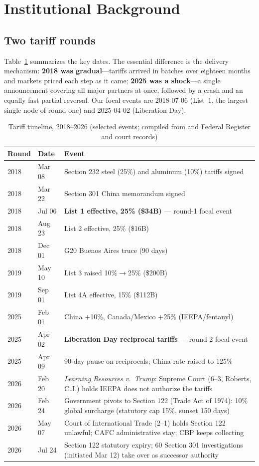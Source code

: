 \documentclass[11pt,a4paper]{article}
\begin{document}
\section{Institutional Background}\label{sec:background}

\subsection{Two tariff rounds}

Table~\ref{tab:timeline} summarizes the key dates. The essential difference
is the delivery mechanism: \textbf{2018 was gradual}---tariffs arrived in
batches over eighteen months and markets priced each step as it came;
\textbf{2025 was a shock}---a single announcement covering all major
partners at once, followed by a crash and an equally fast partial reversal.
Our focal events are 2018-07-06 (List~1, the largest single node of round
one) and 2025-04-02 (Liberation Day).

\begin{table}[htbp]
\centering
\caption{Tariff timeline, 2018--2026 (selected events; compiled from
\citealp{bownkolb2025} and Federal Register and court records)}
\label{tab:timeline}
\small
\begin{tabular}{@{}llp{9.0cm}@{}}
\toprule
Round & Date & Event \\
\midrule
2018 & Mar 08 & Section 232 steel (25\%) and aluminum (10\%) tariffs signed \\
2018 & Mar 22 & Section 301 China memorandum signed \\
2018 & Jul 06 & \textbf{List 1 effective, 25\% (\$34B)} --- round-1 focal event \\
2018 & Aug 23 & List 2 effective, 25\% (\$16B) \\
2018 & Dec 01 & G20 Buenos Aires truce (90 days) \\
2019 & May 10 & List 3 raised 10\%$\to$25\% (\$200B) \\
2019 & Sep 01 & List 4A effective, 15\% (\$112B) \\
\midrule
2025 & Feb 01 & China +10\%, Canada/Mexico +25\% (IEEPA/fentanyl) \\
2025 & Apr 02 & \textbf{Liberation Day reciprocal tariffs} --- round-2 focal event \\
2025 & Apr 09 & 90-day pause on reciprocals; China rate raised to 125\% \\
\midrule
2026 & Feb 20 & \emph{Learning Resources v.\ Trump}: Supreme Court (6--3,
Roberts, C.J.) holds IEEPA does not authorize the tariffs \\
2026 & Feb 24 & Government pivots to Section 122 (Trade Act of 1974): 10\%
global surcharge (statutory cap 15\%, sunset 150 days) \\
2026 & May 07 & Court of International Trade (2--1) holds Section 122
unlawful; CAFC administrative stay; CBP keeps collecting \\
2026 & Jul 24 & Section 122 statutory expiry; 60 Section 301 investigations
(initiated Mar 12) take over as successor authority \\
\bottomrule
\end{tabular}
\end{table}
\end{document}
